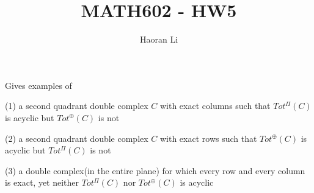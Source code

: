 \documentclass{article}
\title{MATH602 - HW5}
\author{Haoran Li}
\date{}
\newenvironment{exercise}[2][Exercise]{\begin{trivlist}
\item[\hskip \labelsep {\bfseries #1}\hskip \labelsep {\bfseries #2.}]}{\end{trivlist}}
\theoremstyle{definition}
\theoremstyle{remark}
\theoremstyle{definition}
\begin{document}
\sloppy %

\maketitle
\begin{exercise}{\textbf{1.2.6}}
Gives examples of \par
(1) a second quadrant double complex $C$ with exact columns such that $Tot^{\Pi}(C)$ is acyclic but $Tot^{\oplus}(C)$ is not \par
(2) a second quadrant double complex $C$ with exact rows such that $Tot^\oplus(C)$ is acyclic but $Tot^{\Pi}(C)$ is not \par
(3) a double complex(in the entire plane) for which every row and every column is exact, yet neither $Tot^{\Pi}(C)$ nor $Tot^{\oplus}(C)$ is acyclic
\end{exercise}
\end{document}
